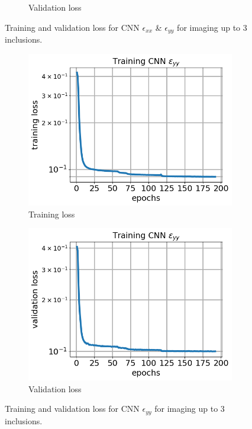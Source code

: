 \documentclass[12pt]{article}
\newcommand{\nhgfigheight}{4.0cm}
\begin{document}
\begin{figure}[h]
\begin{subfigure}[b]{0.45\linewidth}
    \caption{Validation loss}
  \end{subfigure}
\caption{\label{fig:oneinc:trainexxeyy3} Training and validation loss for CNN $\epsilon_{xx}$ \& $\epsilon_{yy}$ for imaging up to 3 inclusions.}
\end{figure}
\begin{figure}[h]
  \centering
  \begin{subfigure}[b]{0.45\linewidth}
    \includegraphics[totalheight=\nhgfigheight]{Figures/final3/training/eyy/field_strainyy_plot_loss.png}
    \caption{Training loss}
  \end{subfigure}
  \begin{subfigure}[b]{0.45\linewidth}
    \includegraphics[totalheight=\nhgfigheight]{Figures/final3/training/eyy/field_strainyy_plot_val_loss.png}
    \caption{Validation loss}
  \end{subfigure}
\caption{\label{fig:oneinc:traineyy3} Training and validation loss for CNN $\epsilon_{yy}$ for imaging up to 3 inclusions.}
\end{figure} 
\end{document}
